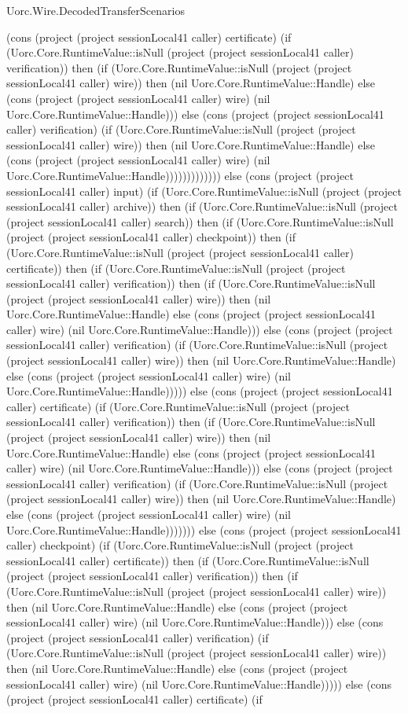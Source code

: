 \begin{lexlean}{Uorc.Wire.DecodedTransferScenarios}
\begin{semanticmodule}
{(cons (project (project sessionLocal41 caller) certificate) (if (Uorc.Core.RuntimeValue::isNull (project (project sessionLocal41 caller) verification)) then (if (Uorc.Core.RuntimeValue::isNull (project (project sessionLocal41 caller) wire)) then (nil Uorc.Core.RuntimeValue::Handle) else (cons (project (project sessionLocal41 caller) wire) (nil Uorc.Core.RuntimeValue::Handle))) else (cons (project (project sessionLocal41 caller) verification) (if (Uorc.Core.RuntimeValue::isNull (project (project sessionLocal41 caller) wire)) then (nil Uorc.Core.RuntimeValue::Handle) else (cons (project (project sessionLocal41 caller) wire) (nil Uorc.Core.RuntimeValue::Handle))))))))))))) else (cons (project (project sessionLocal41 caller) input) (if (Uorc.Core.RuntimeValue::isNull (project (project sessionLocal41 caller) archive)) then (if (Uorc.Core.RuntimeValue::isNull (project (project sessionLocal41 caller) search)) then (if (Uorc.Core.RuntimeValue::isNull (project (project sessionLocal41 caller) checkpoint)) then (if (Uorc.Core.RuntimeValue::isNull (project (project sessionLocal41 caller) certificate)) then (if (Uorc.Core.RuntimeValue::isNull (project (project sessionLocal41 caller) verification)) then (if (Uorc.Core.RuntimeValue::isNull (project (project sessionLocal41 caller) wire)) then (nil Uorc.Core.RuntimeValue::Handle) else (cons (project (project sessionLocal41 caller) wire) (nil Uorc.Core.RuntimeValue::Handle))) else (cons (project (project sessionLocal41 caller) verification) (if (Uorc.Core.RuntimeValue::isNull (project (project sessionLocal41 caller) wire)) then (nil Uorc.Core.RuntimeValue::Handle) else (cons (project (project sessionLocal41 caller) wire) (nil Uorc.Core.RuntimeValue::Handle))))) else (cons (project (project sessionLocal41 caller) certificate) (if (Uorc.Core.RuntimeValue::isNull (project (project sessionLocal41 caller) verification)) then (if (Uorc.Core.RuntimeValue::isNull (project (project sessionLocal41 caller) wire)) then (nil Uorc.Core.RuntimeValue::Handle) else (cons (project (project sessionLocal41 caller) wire) (nil Uorc.Core.RuntimeValue::Handle))) else (cons (project (project sessionLocal41 caller) verification) (if (Uorc.Core.RuntimeValue::isNull (project (project sessionLocal41 caller) wire)) then (nil Uorc.Core.RuntimeValue::Handle) else (cons (project (project sessionLocal41 caller) wire) (nil Uorc.Core.RuntimeValue::Handle))))))) else (cons (project (project sessionLocal41 caller) checkpoint) (if (Uorc.Core.RuntimeValue::isNull (project (project sessionLocal41 caller) certificate)) then (if (Uorc.Core.RuntimeValue::isNull (project (project sessionLocal41 caller) verification)) then (if (Uorc.Core.RuntimeValue::isNull (project (project sessionLocal41 caller) wire)) then (nil Uorc.Core.RuntimeValue::Handle) else (cons (project (project sessionLocal41 caller) wire) (nil Uorc.Core.RuntimeValue::Handle))) else (cons (project (project sessionLocal41 caller) verification) (if (Uorc.Core.RuntimeValue::isNull (project (project sessionLocal41 caller) wire)) then (nil Uorc.Core.RuntimeValue::Handle) else (cons (project (project sessionLocal41 caller) wire) (nil Uorc.Core.RuntimeValue::Handle))))) else (cons (project (project sessionLocal41 caller) certificate) (if }
\end{semanticmodule}
\end{lexlean}
